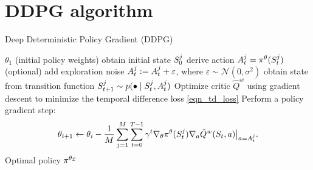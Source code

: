 \documentclass[12pt,twoside]{../../mitthesis}
\begin{document}
\section*{DDPG algorithm}
\begin{algorithm}
    \caption{Deep Deterministic Policy Gradient (DDPG)}
    \label{alg:my-alg}
    \begin{algorithmic}
     $\theta_1$ (initial policy weights)
            \STATE obtain initial state $S_0^{j}$
                \STATE derive action $A_t^j = \pi^{\theta}( S_t^{j})$
                \STATE (optional) add exploration noise $A_t^j:= A_t^j + \varepsilon$, where $\varepsilon\sim\mathcal{N}(0, \sigma^2)$ 
                \STATE obtain state from transition function $S_{t+1}^j \sim p(\bullet \mid S_t^j, A_t^j)$
            \ENDFOR
        \ENDFOR
        \STATE Optimize critic $\hat Q^{w}$ using gradient descent to minimize the temporal difference loss \eqref{eqn_td_loss}
        \STATE Perform a policy gradient step:
        $$
            \theta_{i+1} \leftarrow \theta_i - \frac{1}{M} \sum_{j = 1}^M \sum_{t=0}^{T-1} \gamma ^ t \nabla_{\theta}\pi^{\theta}(S_t^j)\nabla_{a} \hat Q^{w}(S_t, a)\big\rvert_{a = A_t^j}.
        $$
    \ENDFOR
    \STATE \RETURN Optimal policy $\pi^{\theta_{\mathcal I}}$
    \end{algorithmic}
\end{algorithm}
\end{document}
